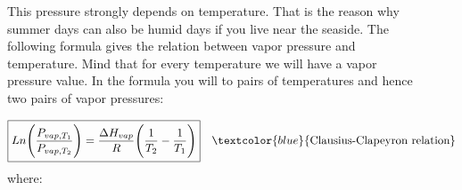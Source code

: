\documentclass[main.tex]{subfiles}
\begin{document}
\begin{description}
\item[] 
This pressure strongly depends on temperature. That is the reason why summer days can also be humid days if you live near the seaside. The following formula gives the relation between vapor pressure and temperature. Mind that for every temperature we will have a vapor pressure value. In the formula you will to pairs of temperatures and hence two pairs of vapor pressures: 

\begin{equation*}
\boxed{  Ln\Bigg(\frac{P_{vap, T_1} }{P_{vap, T_2}}\Bigg)=\frac{\Delta H_{vap}}{R}\Bigg(\frac{1}{T_2}-\frac{1}{T_1}\Bigg)  } \quad \textcolor{blue}{\text{Clausius-Clapeyron relation}}
\end{equation*}
where:


\end{description}
\end{document}

